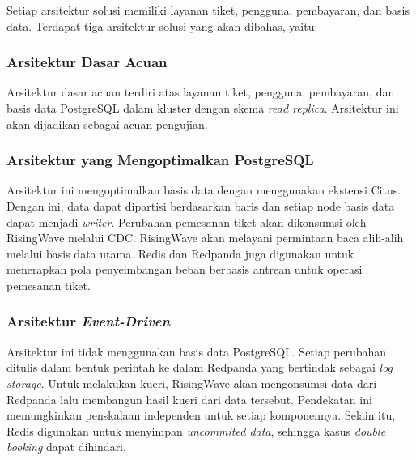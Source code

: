 Setiap arsitektur solusi memiliki layanan tiket, pengguna, pembayaran, dan basis data. Terdapat tiga arsitektur solusi yang akan dibahas, yaitu:

\subsubsection{Arsitektur Dasar Acuan}

Arsitektur dasar acuan terdiri atas layanan tiket, pengguna, pembayaran, dan basis data PostgreSQL dalam kluster dengan skema \textit{read replica}. Arsitektur ini akan dijadikan sebagai acuan pengujian.

\subsubsection{Arsitektur yang Mengoptimalkan PostgreSQL}

Arsitektur ini mengoptimalkan basis data dengan menggunakan ekstensi Citus. Dengan ini, data dapat dipartisi berdasarkan baris dan setiap node basis data dapat menjadi \textit{writer}. Perubahan pemesanan tiket akan dikonsumsi oleh RisingWave melalui CDC. RisingWave akan melayani permintaan baca alih-alih melalui basis data utama. Redis dan Redpanda juga digunakan untuk menerapkan pola penyeimbangan beban berbasis antrean untuk operasi pemesanan tiket.

\subsubsection{Arsitektur \textit{Event-Driven}}

Arsitektur ini tidak menggunakan basis data PostgreSQL. Setiap perubahan ditulis dalam bentuk perintah ke dalam Redpanda yang bertindak sebagai \textit{log storage}. Untuk melakukan kueri, RisingWave akan mengonsumsi data dari Redpanda lalu membangun hasil kueri dari data tersebut. Pendekatan ini memungkinkan penskalaan independen untuk setiap komponennya. Selain itu, Redis digunakan untuk menyimpan \textit{uncommited data}, sehingga kasus \textit{double booking} dapat dihindari.